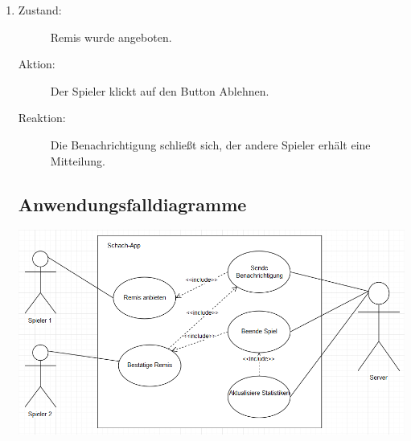 \documentclass[parskip=full]{scrartcl}
\begin{document}
\begin{enumerate}
	\item
	\begin{description}
	\item[Zustand:] Remis wurde angeboten.
	\item[Aktion:] Der Spieler klickt auf den Button \glqq Ablehnen\grqq.
	\item[Reaktion:] Die Benachrichtigung schließt sich, der andere Spieler erhält eine Mitteilung.  \\
	\end{description}



\subsection{Anwendungsfalldiagramme} 
		\begin{minipage}{\linewidth}
			\centering
			\includegraphics[width=1\linewidth]{Remis}
			\label{fig:remis}
		\end{minipage}
\end{enumerate}

\glsaddall 
\printglossaries
\end{document}
